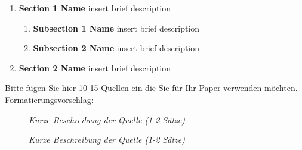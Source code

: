 \documentclass[
    ngerman,american
    ]{scrartcl}
\newcommand{\lang}{en}
\begin{document}
        \sectionInitialTOC{\lang}
        
        \begin{enumerate}
            \item \textbf{Section 1 Name} insert brief description
                    \begin{enumerate}
                        \item \textbf{Subsection 1 Name} insert brief description
                        \item \textbf{Subsection 2 Name} insert brief description
                    \end{enumerate}
            \item \textbf{Section 2 Name} insert brief description
        \end{enumerate}
    
      
        \sectionSource{\lang}
        Bitte fügen Sie hier 10-15 Quellen ein die Sie für Ihr Paper verwenden möchten.
        Formatierungsvorschlag:
        
        \begin{description}
        \item[\cite{gruba_how_2017}] \textit{Kurze Beschreibung der Quelle (1-2 Sätze)}
        \item[\cite{zobel_writing_2015}] \textit{Kurze Beschreibung der Quelle (1-2 Sätze)}
        \end{description}
        
        
      \printbibliography
    
\end{document}
